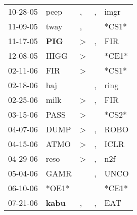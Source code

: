\begin{supertabular}{p{0.07\textwidth}p{0.06\textwidth}p{0.02\textwidth}p{0.02\textwidth}p{0.06\textwidth}}
          10-28-05\textsuperscript{} &           peep\textsuperscript{} &                , &                , &           imgr\textsuperscript{} \\
          11-09-05\textsuperscript{} &           tway\textsuperscript{} &                , &                  &                            *CS1* \\
          11-17-05\textsuperscript{} &   \textbf{PIG\textsuperscript{}} &     \textgreater &                , &            FIR\textsuperscript{} \\
          12-08-05\textsuperscript{} &           HIGG\textsuperscript{} &     \textgreater &                  &                            *CE1* \\
          02-11-06\textsuperscript{} &            FIR\textsuperscript{} &     \textgreater &                  &                            *CS1* \\
          02-18-06\textsuperscript{} &            haj\textsuperscript{} &                  &                , &           ring\textsuperscript{} \\
          02-25-06\textsuperscript{} &           milk\textsuperscript{} &     \textgreater &                , &            FIR\textsuperscript{} \\
          03-15-06\textsuperscript{} &           PASS\textsuperscript{} &     \textgreater &                  &                            *CS2* \\
          04-07-06\textsuperscript{} &           DUMP\textsuperscript{} &     \textgreater &                , &           ROBO\textsuperscript{} \\
          04-15-06\textsuperscript{} &           ATMO\textsuperscript{} &     \textgreater &                , &           ICLR\textsuperscript{} \\
          04-29-06\textsuperscript{} &           reso\textsuperscript{} &     \textgreater &                , &            n2f\textsuperscript{} \\
          05-04-06\textsuperscript{} &           GAMR\textsuperscript{} &                  &                , &           UNCO\textsuperscript{} \\
          06-10-06\textsuperscript{} &                            *OE1* &                  &                  &                            *CE1* \\
          07-21-06\textsuperscript{} &  \textbf{kabu\textsuperscript{}} &                , &                , &            EAT\textsuperscript{} \\

\end{supertabular}
